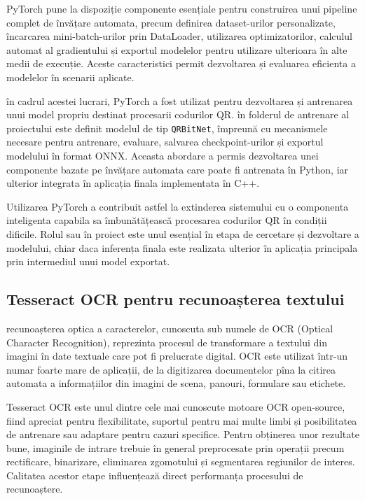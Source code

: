 PyTorch pune la dispoziție componente esențiale pentru construirea unui pipeline complet de învățare automata, precum definirea dataset-urilor personalizate, încarcarea mini-batch-urilor prin DataLoader, utilizarea optimizatorilor, calculul automat al gradientului și exportul modelelor pentru utilizare ulterioara în alte medii de execuție. Aceste caracteristici permit dezvoltarea și evaluarea eficienta a modelelor în scenarii aplicate.

în cadrul acestei lucrari, PyTorch a fost utilizat pentru dezvoltarea și antrenarea unui model propriu destinat procesarii codurilor QR. în folderul de antrenare al proiectului este definit modelul de tip \texttt{QRBitNet}, împreună cu mecanismele necesare pentru antrenare, evaluare, salvarea checkpoint-urilor și exportul modelului în format ONNX. Aceasta abordare a permis dezvoltarea unei componente bazate pe învățare automata care poate fi antrenata în Python, iar ulterior integrata în aplicația finala implementata în C++.

Utilizarea PyTorch a contribuit astfel la extinderea sistemului cu o componenta inteligenta capabila sa îmbunătățească procesarea codurilor QR în condiții dificile. Rolul sau în proiect este unul esențial în etapa de cercetare și dezvoltare a modelului, chiar daca inferența finala este realizata ulterior în aplicația principala prin intermediul unui model exportat.

\subsection*{Tesseract OCR pentru recunoașterea textului}

recunoașterea optica a caracterelor, cunoscuta sub numele de OCR (Optical Character Recognition), reprezinta procesul de transformare a textului din imagini în date textuale care pot fi prelucrate digital. OCR este utilizat într-un numar foarte mare de aplicații, de la digitizarea documentelor pîna la citirea automata a informațiilor din imagini de scena, panouri, formulare sau etichete.

Tesseract OCR este unul dintre cele mai cunoscute motoare OCR open-source, fiind apreciat pentru flexibilitate, suportul pentru mai multe limbi și posibilitatea de antrenare sau adaptare pentru cazuri specifice. Pentru obținerea unor rezultate bune, imaginile de intrare trebuie în general preprocesate prin operații precum rectificare, binarizare, eliminarea zgomotului și segmentarea regiunilor de interes. Calitatea acestor etape influențează direct performanța procesului de recunoaștere.

